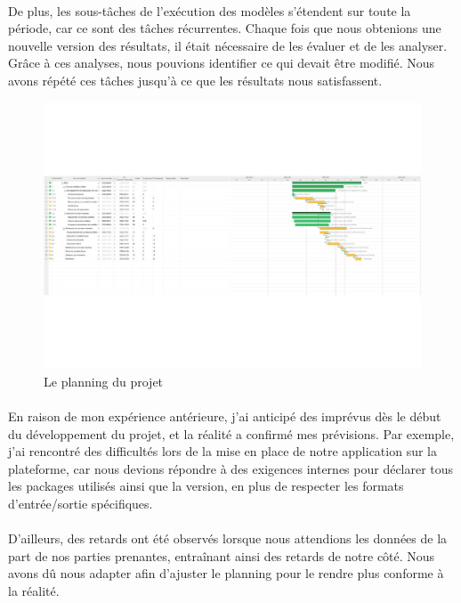\paragraph{}
\vspace{-2em}
De plus, les sous-tâches de l'exécution des modèles s'étendent sur toute la période, car ce sont des tâches récurrentes. Chaque fois que nous obtenions une nouvelle version des résultats, il était nécessaire de les évaluer et de les analyser. Grâce à ces analyses, nous pouvions identifier ce qui devait être modifié. Nous avons répété ces tâches jusqu'à ce que les résultats nous satisfassent.
\begin{figure}[H]
    \centering
    \includegraphics[angle = 270, width=1\linewidth]{./Graphismes-UTC/logos/Amazon/RDS (2).pdf}\hfill
    \caption{Le planning du projet}
\end{figure}

\clearpage
\paragraph{}
\vspace{-2em}
En raison de mon expérience antérieure, j'ai anticipé des imprévus dès le début du développement du projet, et la réalité a confirmé mes prévisions. Par exemple, j'ai rencontré des difficultés lors de la mise en place de notre application sur la plateforme, car nous devions répondre à des exigences internes pour déclarer tous les packages utilisés ainsi que la version, en plus de respecter les formats d'entrée/sortie spécifiques.
\paragraph{}
\vspace{-2em}
D'ailleurs, des retards ont été observés lorsque nous attendions les données de la part de nos parties prenantes, entraînant ainsi des retards de notre côté. Nous avons dû nous adapter afin d'ajuster le planning pour le rendre plus conforme à la réalité.
